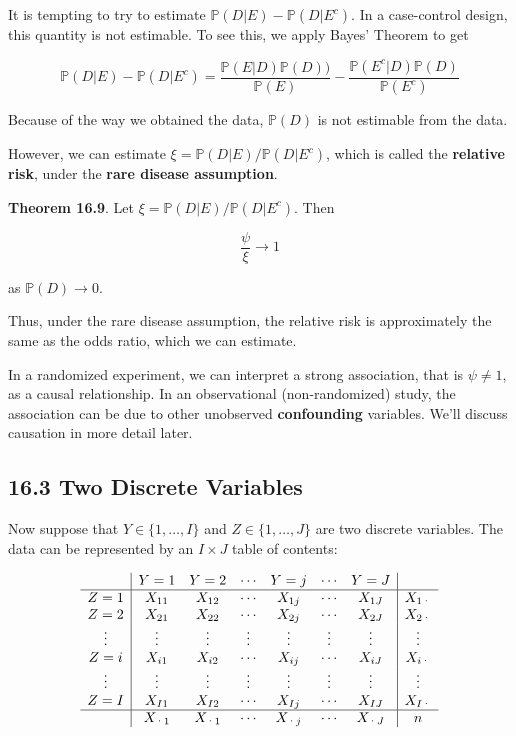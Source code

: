 It is tempting to try to estimate
\(\mathbb{P}(D | E) - \mathbb{P}(D | E^{c})\). In a case-control design,
this quantity is not estimable. To see this, we apply Bayes' Theorem to
get

\[\mathbb{P}(D | E) - \mathbb{P}(D | E^{c}) = \frac{\mathbb{P}(E | D) \mathbb{P}(D))}{\mathbb{P}(E)} - \frac{\mathbb{P}(E^{c} | D) \mathbb{P}(D)}{\mathbb{P}(E^{c})}\]

Because of the way we obtained the data, \(\mathbb{P}(D)\) is not
estimable from the data.

However, we can estimate
\(\xi = \mathbb{P}(D | E) / \mathbb{P}(D | E^{c})\), which is called the
\textbf{relative risk}, under the \textbf{rare disease assumption}.

\textbf{Theorem 16.9}. Let
\(\xi = \mathbb{P}(D | E) / \mathbb{P}(D | E^{c})\). Then

\[ \frac{\psi}{\xi} \rightarrow 1\]

as \(\mathbb{P}(D) \rightarrow 0\).

Thus, under the rare disease assumption, the relative risk is
approximately the same as the odds ratio, which we can estimate.

In a randomized experiment, we can interpret a strong association, that
is \(\psi \neq 1\), as a causal relationship. In an observational
(non-randomized) study, the association can be due to other unobserved
\textbf{confounding} variables. We'll discuss causation in more detail
later.

\subsection*{16.3 Two Discrete
Variables}\label{two-discrete-variables}

Now suppose that \(Y \in \{ 1, \dots, I \}\) and
\(Z \in \{ 1, \dots, J \}\) are two discrete variables. The data can be
represented by an \(I \times J\) table of contents:

    \[
\begin{array}{c|cccccc|c} 
       & Y = 1  & Y = 2  & \cdots & Y = j & \cdots & Y = J   & \\
\hline
Z = 1 & X_{11}  & X_{12} & \cdots & X_{1j} & \cdots & X_{1J} & X_{1\text{·}}\\
Z = 2 & X_{21}  & X_{22} & \cdots & X_{2j} & \cdots & X_{2J} & X_{2\text{·}}\\
\vdots & \vdots & \vdots & \vdots & \vdots & \vdots & \vdots & \vdots\\
Z = i & X_{i1}  & X_{i2} & \cdots & X_{ij} & \cdots & X_{iJ} & X_{i\text{·}}\\
\vdots & \vdots & \vdots & \vdots & \vdots & \vdots & \vdots & \vdots\\
Z = I & X_{I1}  & X_{I2} & \cdots & X_{Ij} & \cdots & X_{IJ} & X_{I\text{·}}\\
 \hline
      & X_{\text{·}1} & X_{\text{·}1} & \cdots & X_{\text{·}j} & \cdots & X_{\text{·}J} & n
\end{array}
\]

